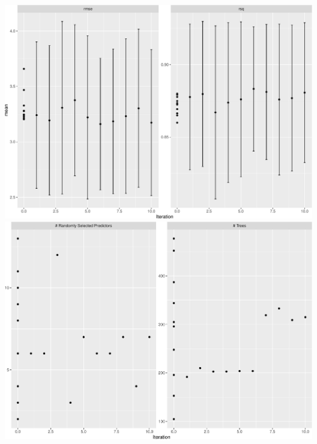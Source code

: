 \documentclass[
  ignorenonframetext,
]{beamer}
\begin{document}
\begin{frame}[fragile]
\includegraphics{L7_files/figure-beamer/unnamed-chunk-9-1.pdf}
\includegraphics{L7_files/figure-beamer/unnamed-chunk-9-2.pdf}

\end{frame}
\end{document}
